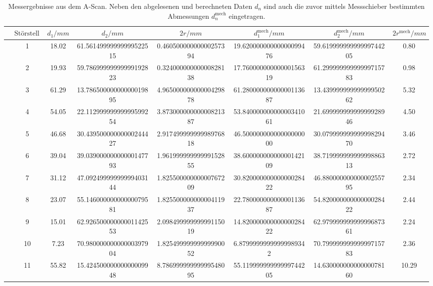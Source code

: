 \begin{table}
        \caption{Messergebnisse aus dem A-Scan. Neben den abgelesenen und berechneten Daten $d_n$ sind auch die zuvor mittels Messschieber bestimmten Abmessungen $d_n^\text{mech}$ eingetragen.}
        \centering
        \label{tab:a}
        \begin{tabular}{l@{}S[round-mode=off, table-format=2.0]S[table-format=2.3, round-precision=4, round-mode=off] S[table-format=2.2, round-precision=4, round-mode=figures] S[table-format=1.4, round-precision=2, round-mode=places] S[table-format=2.3, round-precision=2, round-mode=places] S[table-format=2.2, round-precision=4, round-mode=figures] S[table-format=2.4, round-precision=4, round-mode=off] } \toprule & {$\text{Störstelle}$}& {$d_1/\si{mm}$}& {$d_2/\si{mm}$}& {$2r/\si{mm}$}& {$d_1^\text{mech}/\si{mm}$}& {$d_2^\text{mech}/\si{mm}$}& {$2r^\text{mech}/\si{mm}$}\\\midrule
& 1 & 18.02 & 61.56149999999999522515 & 0.46050000000000257394 & 19.62000000000000099476 & 59.61999999999999744205 & 0.80 \\
& 2 & 19.93 & 59.78699999999999192823 & 0.32400000000000828138 & 17.76000000000000156319 & 61.29999999999999715783 & 0.98 \\
& 3 & 61.29 & 13.78650000000000019895 & 4.96500000000000429878 & 61.28000000000000113687 & 13.43999999999999950262 & 5.32 \\
& 4 & 54.05 & 22.11299999999999599254 & 3.87300000000000821387 & 53.84000000000000341061 & 21.69999999999999928946 & 4.50 \\
& 5 & 46.68 & 30.43950000000000244427 & 2.91749999999998976818 & 46.50000000000000000000 & 30.07999999999999829470 & 3.46 \\
& 6 & 39.04 & 39.03900000000000147793 & 1.96199999999999152855 & 38.60000000000000142109 & 38.71999999999999886313 & 2.72 \\
& 7 & 31.12 & 47.09249999999999403144 & 1.82550000000000767209 & 30.82000000000000028422 & 46.88000000000000255795 & 2.34 \\
& 8 & 23.07 & 55.14600000000000079581 & 1.82550000000000411937 & 22.78000000000000113687 & 54.82000000000000028422 & 2.44 \\
& 9 & 15.01 & 62.92650000000001142553 & 2.09849999999999115019 & 14.82000000000000028422 & 62.97999999999999687361 & 2.24 \\
& 10 & 7.23 & 70.98000000000000397904 & 1.82549999999999990052 & 6.87999999999999989342 & 70.79999999999999715783 & 2.36 \\
& 11 & 55.82 & 15.42450000000000009948 & 8.78699999999999548095 & 55.11999999999999744205 & 14.63000000000000078160 & 10.29 \\
 \bottomrule \end{tabular} \end{table}
